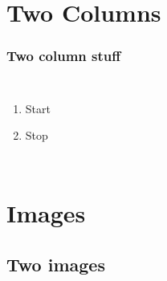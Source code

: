 \section{Two Columns}

\begin{frame}
	\frametitle{Two column stuff}
    \begin{columns}
                 \begin{enumerate}
                 \item Start
                 \item Stop
                 \end{enumerate}
    \end{columns}
\end{frame}
















\section{Images}





\subsection{Two images}


